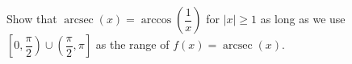  {Show that $\operatorname{arcsec}(x) = \arccos \left( \dfrac{1}{x} \right)$ for $|x| \geq 1$ as long as we use $\left[0, \dfrac{\pi}{2} \right) \cup \left( \dfrac{\pi}{2}, \pi \right]$ as the range of $f(x) = \operatorname{arcsec}(x)$.}
{}

